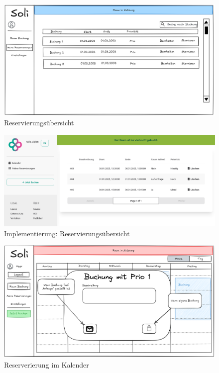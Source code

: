 \begin{figure}[ht]
    \includegraphics[width=\textwidth]{figures/mockup/bookings_list}
    \caption{Reservierungsübersicht}
    \label{fig:overview}
\end{figure}
\begin{figure}[ht]
    \includegraphics[width=\textwidth]{figures/impl-views/bookings_list_light}
    \caption{Implementierung: Reservierungsübersicht}
    \label{fig:impl-overview}
\end{figure}
\clearpage
\begin{figure}
    \centering
    \includegraphics[width=\textwidth]{figures/mockup/bookings_single}
    \caption{Reserverierung im Kalender}
    \label{fig:calendarviewbooking}
\end{figure}
